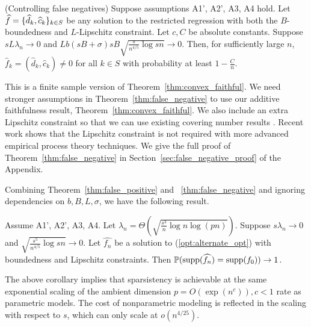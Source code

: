 \begin{theorem} (Controlling false negatives)
\label{thm:false_negative}
Suppose assumptions A1', A2', A3, A4 hold. Let $\displaystyle \widehat{f} = \{ \widehat{d}_k, \widehat{c}_k\}_{k\in S}$ be any solution to the restricted regression with both the $B$-boundedness and $L$-Lipschitz constraint. Let $c,C$ be absolute constants.
Suppose $s L \lambda_n \rightarrow 0$ and $Lb(sB+\sigma)sB \sqrt{\frac{s}{n^{4/5}} \log sn} \rightarrow 0$.
Then, for sufficiently large $n$, $\hat{f}_k = (\hat{d}_k, \hat{c}_k)
\neq 0$ for all $k \in S$ with probability at least $1-\frac{C}{n}$.
\end{theorem}

This is a finite sample version of
Theorem~\ref{thm:convex_faithful}. We need stronger assumptions in
Theorem~\ref{thm:false_negative} to use our additive faithfulness
result, Theorem~\ref{thm:convex_faithful}. We also include an extra
Lipschitz constraint so that we can use existing covering number
results \cite{Bronshtein:76}. Recent work
\cite{Guntu:13} shows that the Lipschitz constraint
is not required with more advanced empirical process theory
techniques. We give the full proof of Theorem~\ref{thm:false_negative}
in Section~\ref{sec:false_negative_proof} of the Appendix.

Combining Theorem~\ref{thm:false_positive} and
~\ref{thm:false_negative} and ignoring dependencies on $b,B,L,\sigma$,
we have the following result.
\begin{corollary}
  Assume A1', A2', A3, A4. Let $\lambda_n = \Theta\left( \sqrt{
  \frac{s^3}{n} \log n \log (pn)} \right)$. Suppose $s \lambda_n
  \rightarrow 0$ and $\sqrt{\frac{s^5}{n^{4/5}} \log sn} \rightarrow
  0$. Let $\hat{f_n}$ be a solution to (\ref{opt:alternate_opt}) with
  boundedness and Lipschitz constraints. Then 
  ${\mathbb P}( \textrm{supp}(\widehat{f_n}) = \textrm{supp}(f_0) ) \rightarrow 1$.
\end{corollary}
The above corollary implies that sparsistency is achievable at the same exponential scaling of the ambient dimension $p = O(\exp(n^c)), c<1$ rate as parametric models. The cost of nonparametric modeling is reflected in the scaling with respect to $s$, which can only scale at $o(n^{4/25})$.



 
